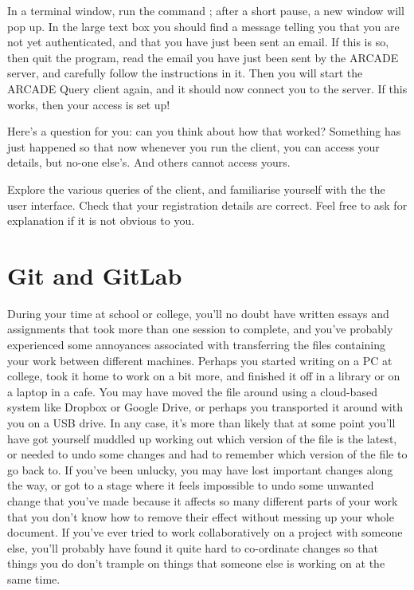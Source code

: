 In a terminal window, run the command ; after a short pause, a new window will pop up. In the large text box you should find a message telling you that you are not yet authenticated, and that you have just been sent an email. If this is so, then quit the program, read the email you have just been sent by the ARCADE server, and carefully follow the instructions in it. Then you will start the ARCADE Query client again, and it should now connect you to the server. If this works, then your access is set up!

Here's a question for you: can you think about how that worked? Something has just happened so that now whenever you run the client, you can access your details, but no-one else's. And others cannot access yours.

Explore the various queries of the client, and familiarise yourself with the the user interface. Check that your registration details are correct. Feel free to ask for explanation if it is not obvious to you.


\section{Git and GitLab}

During your time at school or college, you'll no doubt have written essays and assignments that took more than one session to complete, and you've probably experienced some annoyances associated with transferring the files containing your work between different machines. Perhaps you started writing on a PC at college, took it home to work on a bit more, and finished it off in a library or on a laptop in a cafe. You may have moved the file around using a cloud-based system like Dropbox or Google Drive, or perhaps you transported it around with you on a USB drive. In any case, it's more than likely that at some point you'll have got yourself muddled up working out which version of the file is the latest, or needed to undo some changes and had to remember which version of the file to go back to. If you've been unlucky, you may have lost important changes along the way, or got to a stage where it feels impossible to undo some unwanted change that you've made because it affects so many different parts of your work that you don't know how to remove their effect without messing up your whole document. If you've ever tried to work collaboratively on a project with someone else, you'll probably have found it quite hard to co-ordinate changes so that things you do don't trample on things that someone else is working on at the same time. 

